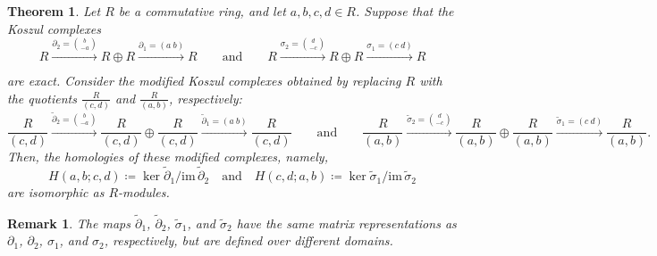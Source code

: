 \documentclass[aps,prl,english,superscriptaddress,twocolumn,tightenlines,showpacs,longbibliography,floatfix,amsfonts]{revtex4-2}
\newtheorem{thm}{Theorem}
\newtheorem{rem}{Remark}
\begin{document}
\begin{thm} \label{thm:Koszul}
	Let $R$ be a commutative ring, and let $a,b,c,d\in R$. Suppose that
	the Koszul complexes
	\begin{equation}
		R\xrightarrow[\phantom{(d\ c)}]{\partial_{2}={b \choose -a}}R\oplus R\xrightarrow{\partial_{1}=(a\ b)}R\qquad\text{and}\qquad R\xrightarrow[\phantom{(d\ c)}]{\sigma_{2}={d \choose -c}}R\oplus R\xrightarrow{\sigma_{1}=(c\ d)}R
	\end{equation}
	are exact. Consider the modified Koszul complexes obtained by replacing
	$R$ with the quotients $\frac{R}{\left(c,d\right)}$ and $\frac{R}{\left(a,b\right)}$,
	respectively:
	\begin{equation}
		\frac{R}{\left(c,d\right)}\xrightarrow[\phantom{(d\ c)}]{\tilde{\partial}_{2}={b \choose -a}}\frac{R}{\left(c,d\right)}\oplus\frac{R}{\left(c,d\right)}\xrightarrow{\tilde{\partial}_{1}=(a\ b)}\frac{R}{\left(c,d\right)}\qquad\text{and}\qquad\frac{R}{\left(a,b\right)}\xrightarrow[\phantom{(d\ c)}]{\tilde{\sigma}_{2}={d \choose -c}}\frac{R}{\left(a,b\right)}\oplus\frac{R}{\left(a,b\right)}\xrightarrow{\tilde{\sigma}_{1}=(c\ d)}\frac{R}{\left(a,b\right)}.
	\end{equation}
	Then, the homologies of these modified complexes, namely,
	\begin{equation}
		H\left(a,b;c,d\right)\coloneqq\ker\tilde{\partial}_{1}/\mathrm{im}\,\tilde{\partial}_{2}\quad\text{and}\quad H\left(c,d;a,b\right)\coloneqq\ker\tilde{\sigma}_{1}/\mathrm{im}\,\tilde{\sigma}_{2}
	\end{equation}
	are isomorphic as $R$-modules.
\end{thm}
\begin{rem}
	The maps $\tilde{\partial}_{1}$, $\tilde{\partial}_{2}$, $\tilde{\sigma}_{1}$,
	and $\tilde{\sigma}_{2}$ have the same matrix representations as
	$\partial_{1}$, $\partial_{2}$, $\sigma_{1}$, and $\sigma_{2}$,
	respectively, but are defined over different domains.
\end{rem}
\end{document}
